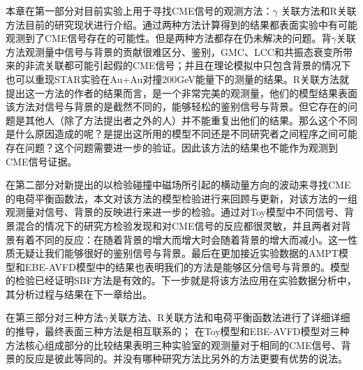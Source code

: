 本章在第一部分对目前实验上用于寻找CME信号的观测方法：$\gamma$ 关联方法和R关联方法目前的研究现状进行介绍。通过两种方法计算得到的结果都表面实验中有可能观测到了CME信号存在的可能性。但是两种方法都存在仍未解决的问题。背$\gamma$关联方法观测量中信号与背景的贡献很难区分、鉴别，GMC、LCC和共振态衰变所带来的非流关联都可能引起假的CME信号；并且在理论模拟中只包含背景的情况下也可以重现STAR实验在Au+Au对撞200GeV能量下的测量的结果。R关联方法就提出这一方法的作者的结果而言，是一个非常完美的观测量，他们的模型结果表面该方法对信号与背景的是截然不同的，能够轻松的鉴别信号与背景。但它存在的问题是其他人（除了方法提出者之外的人）并不能重复出他们的结果。那么这个不同是什么原因造成的呢？是提出这所用的模型不同还是不同研究者之间程序之间可能存在问题？这个问题需要进一步的验证。因此该方法的结果也不能作为观测到CME信号证据。

在第二部分对新提出的以检验碰撞中磁场所引起的横动量方向的波动来寻找CME的电荷平衡函数法，本文对该方法的模型检验进行来回顾与更新，对该方法的一组观测量对信号、背景的反映进行来进一步的检验。通过对Toy模型中不同信号、背景混合的情况下的研究方检验发现\rrest 和\rb 对CME信号的反应都很灵敏，并且两者对背景有着不同的反应：在\rrest 随着背景的增大而增大时\rb 会随着背景的增大而减小。这一性质无疑让我们能够很好的鉴别信号与背景。最后在更加接近实验数据的AMPT模型和EBE-AVFD模型中的结果也表明我们的方法是能够区分信号与背景的。模型的检验已经证明SBF方法是有效的。下一步就是将该方法应用在实验数据分析中，其分析过程与结果在下一章给出。

在第三部分对三种方法$ \gamma$关联方法、R关联方法和电荷平衡函数法进行了详细详细的推导，最终表面三种方法是相互联系的；
在Toy模型和EBE-AVFD模型对三种方法核心组成部分的比较结果表明三种实验室的观测量对于相同的CME信号、背景的反应是彼此等同的。并没有哪种研究方法比另外的方法更要有优势的说法。

